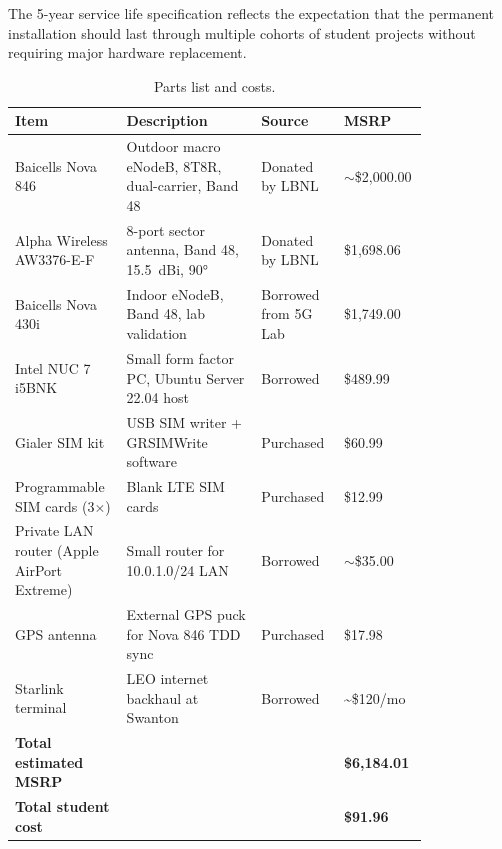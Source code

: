 \documentclass[
    left=1.5in,
    right=1.25in,
    top=1.25in,
    bottom=1.25in
]{CalPolySeniorProject}
\begin{document}
The 5-year service life specification reflects the expectation that the permanent
installation should last through multiple cohorts of student projects without
requiring major hardware replacement.

\label{appendix:parts}

\begin{table}[!ht]
    \centering
    \caption[Parts list and costs]{Parts list and costs.}
    \vspace{0.5\baselineskip}
    \begin{tabular}{p{0.22\linewidth}p{0.30\linewidth}p{0.16\linewidth}p{0.14\linewidth}}
        \toprule
        \textbf{Item} & \textbf{Description} & \textbf{Source}
            & \textbf{MSRP} \\
        \midrule
        Baicells Nova 846 & Outdoor macro eNodeB, 8T8R, dual-carrier, Band 48
            & Donated by LBNL & $\sim$\$2,000.00 \\
        \addlinespace
        Alpha Wireless AW3376-E-F & 8-port sector antenna, Band 48, 15.5~dBi, 90°
            & Donated by LBNL & \$1,698.06 \\
        \addlinespace
        Baicells Nova 430i & Indoor eNodeB, Band 48, lab validation
            & Borrowed from 5G Lab & \$1,749.00 \\
        \addlinespace
        Intel NUC 7 i5BNK & Small form factor PC, Ubuntu Server 22.04 host
            & Borrowed & {\$489.99} \\
        \addlinespace
        Gialer SIM kit & USB SIM writer + GRSIMWrite software
            & Purchased & \$60.99 \\
        \addlinespace
        Programmable SIM cards (3$\times$) & Blank LTE SIM cards
            & Purchased & \$12.99 \\
        \addlinespace
        Private LAN router (Apple AirPort Extreme) & Small router for 10.0.1.0/24 LAN
            & Borrowed & $\sim$\$35.00 \\
        \addlinespace
        GPS antenna & External GPS puck for Nova 846 TDD sync
            & Purchased & \$17.98 \\
        \addlinespace
        Starlink terminal & LEO internet backhaul at Swanton
            & Borrowed & \textasciitilde\$120/mo \\
        \midrule
        \textbf{Total estimated MSRP} & & & \textbf{\$6,184.01} \\
        \addlinespace
        \textbf{Total student cost} & & & \textbf{\$91.96} \\
        \bottomrule
    \end{tabular}
    \label{tab:parts}
\end{table}
\end{document}
